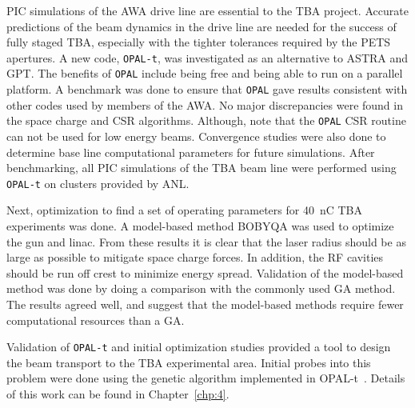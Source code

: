 
PIC simulations of the AWA drive line are essential to the TBA project. 
Accurate predictions of the beam dynamics in the drive line are needed for the 
success of fully staged TBA, especially with the tighter tolerances required by the PETS apertures.
A new code, \verb|OPAL-t|, was investigated as an alternative to ASTRA and GPT. 
The benefits of \verb|OPAL| include being free and being able to run on a parallel platform.
A benchmark was done to ensure that \verb|OPAL| gave results consistent with other codes used by members of the AWA.
No major discrepancies were found in the space charge and CSR algorithms.
Although, note that the \verb|OPAL| CSR routine can not be used for low energy beams.
Convergence studies were also done to determine base line computational 
parameters for future simulations.
After benchmarking, all PIC simulations of the TBA beam line were performed using \verb|OPAL-t| on clusters provided by ANL.

Next, optimization to find a set of operating parameters for
\SI{40}{nC} TBA experiments was done. A model-based method BOBYQA was used to optimize the gun and linac. 
From these results it is clear that the laser radius should be as large as possible to mitigate space charge forces.
In addition, the RF cavities should be run off crest to minimize energy spread.
Validation of the model-based method was done by doing a comparison with the commonly used GA method. 
The results agreed well, and suggest that the model-based methods require fewer computational resources than a GA. 

Validation of \verb|OPAL-t| and initial optimization studies provided a tool 
to design the beam transport to the TBA experimental area.  
Initial probes into this problem were done using the genetic algorithm
implemented in OPAL-t~\cite{optpilot}. Details of this work can be found in Chapter~\ref{chp:4}.





